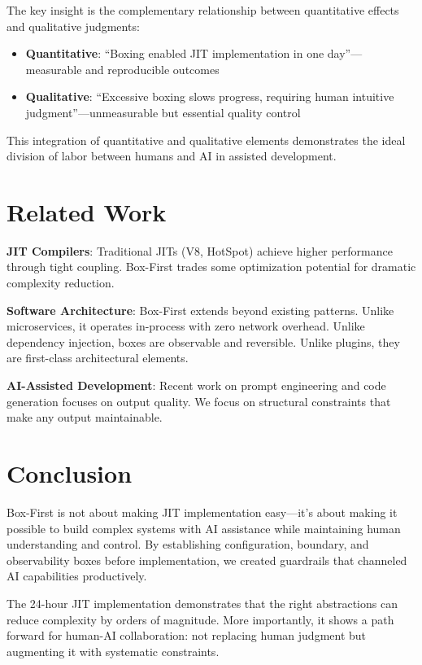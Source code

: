 \documentclass[10pt,conference]{IEEEtran}
\begin{document}
The key insight is the complementary relationship between quantitative effects and qualitative judgments:
\begin{itemize}
\item \textbf{Quantitative}: ``Boxing enabled JIT implementation in one day''---measurable and reproducible outcomes
\item \textbf{Qualitative}: ``Excessive boxing slows progress, requiring human intuitive judgment''---unmeasurable but essential quality control
\end{itemize}

This integration of quantitative and qualitative elements demonstrates the ideal division of labor between humans and AI in assisted development.

\section{Related Work}

\textbf{JIT Compilers}: Traditional JITs (V8, HotSpot) achieve higher performance through tight coupling. Box-First trades some optimization potential for dramatic complexity reduction.

\textbf{Software Architecture}: Box-First extends beyond existing patterns. Unlike microservices, it operates in-process with zero network overhead. Unlike dependency injection, boxes are observable and reversible. Unlike plugins, they are first-class architectural elements.

\textbf{AI-Assisted Development}: Recent work on prompt engineering and code generation focuses on output quality. We focus on structural constraints that make any output maintainable.

\section{Conclusion}

Box-First is not about making JIT implementation easy---it's about making it possible to build complex systems with AI assistance while maintaining human understanding and control. By establishing configuration, boundary, and observability boxes before implementation, we created guardrails that channeled AI capabilities productively.

The 24-hour JIT implementation demonstrates that the right abstractions can reduce complexity by orders of magnitude. More importantly, it shows a path forward for human-AI collaboration: not replacing human judgment but augmenting it with systematic constraints.
\end{document}
